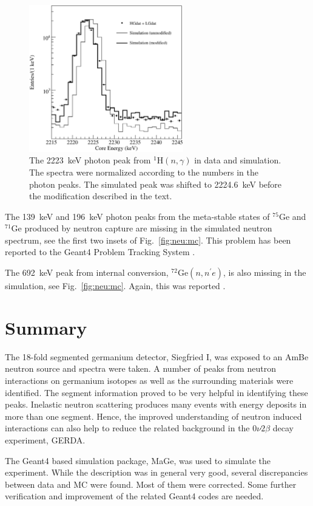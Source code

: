 \begin{figure}[tbhp]
\centering
\includegraphics[width=0.6\textwidth]{h2223}
\caption{The 2223~keV photon peak from $^{1}$H$(n,\gamma)$ in data and simulation. The spectra were normalized according to the numbers in the photon peaks. The simulated peak was shifted to 2224.6~keV before the modification described in the text.}
\label{fig:neu:h2223}
\end{figure}

The 139~keV and 196~keV photon peaks from the meta-stable states of $^{75}$Ge and $^{71}$Ge produced by neutron capture are missing in the simulated neutron spectrum, see the first two insets of Fig.~\ref{fig:neu:mc}. This problem has been reported to the Geant4 Problem Tracking System \cite{g4bug3}.

The 692~keV peak from internal conversion, $^{72}$Ge$(n,n^{\prime}e)$, is also missing in the simulation, see Fig.~\ref{fig:neu:mc}. Again, this was reported \cite{g4bug4}.

\section{Summary}
\label{sec:neu:out}
The 18-fold segmented germanium detector, Siegfried I, was exposed to an AmBe neutron source and spectra were taken. A number of peaks from neutron interactions on germanium isotopes as well as the surrounding materials were identified. The segment information proved to be very helpful in identifying these peaks. Inelastic neutron scattering produces many events with energy deposits in more than one segment. Hence, the improved understanding of neutron induced interactions can also help to reduce the related background in the $0\nu2\beta$ decay experiment, GERDA.

The Geant4 based simulation package, MaGe, was used to simulate the experiment. While the description was in general very good, several discrepancies between data and MC were found. Most of them were corrected. Some further verification and improvement of the related Geant4 codes are needed.


